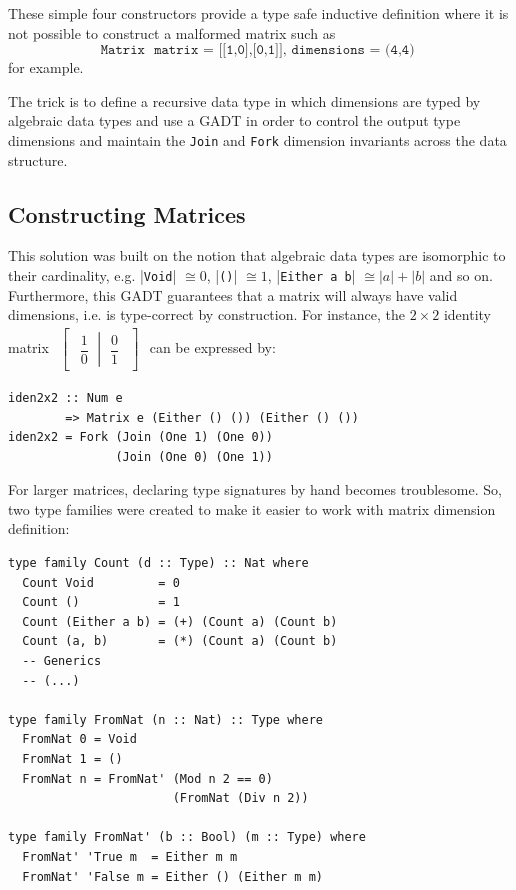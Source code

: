 \documentclass[sigplan,screen]{acmart}
\newcommand{\hs}{\texttt}
\begin{document}
These simple four constructors provide a type safe inductive definition where it is not possible to construct a malformed matrix such as \[\hs{Matrix { matrix = [[1,0],[0,1]], dimensions = (4,4) }}\] for example.

The trick is to define a recursive data type in which dimensions are typed by algebraic data types and use a GADT in order to control the output type dimensions and maintain the \hs{Join} and \hs{Fork} dimension invariants across the data structure.

\subsection{Constructing Matrices}

This solution was built on the notion that algebraic data types are isomorphic to their cardinality, e.g. |\hs{Void}| $ \cong 0$, |\hs{()}| $\cong 1$, |\hs{Either a b}| $\cong |a| + |b|$ and so on. Furthermore, this GADT guarantees that a matrix will always have valid dimensions, i.e. is type-correct by construction. For instance, the $2 \times 2$ identity matrix
%
$\begin{aligned}
\begin{bmatrix}
\left.\begin{matrix}
\dfrac{1}{0}
\end{matrix}\ \right|\ \begin{matrix}
\dfrac{0}{1}
\end{matrix}
\end{bmatrix}
\end{aligned}{}$ can be expressed by:
\vspace{1mm}
\begin{verbatim}
iden2x2 :: Num e 
        => Matrix e (Either () ()) (Either () ())
iden2x2 = Fork (Join (One 1) (One 0)) 
               (Join (One 0) (One 1))
\end{verbatim}
\vspace{1mm}

For larger matrices, declaring type signatures by hand becomes troublesome. So, two type families were created to make it easier to work with matrix dimension definition:

\vspace{1mm}
\begin{verbatim}
type family Count (d :: Type) :: Nat where
  Count Void         = 0
  Count ()           = 1
  Count (Either a b) = (+) (Count a) (Count b)
  Count (a, b)       = (*) (Count a) (Count b)
  -- Generics
  -- (...)
  
type family FromNat (n :: Nat) :: Type where
  FromNat 0 = Void
  FromNat 1 = ()
  FromNat n = FromNat' (Mod n 2 == 0) 
                       (FromNat (Div n 2))

type family FromNat' (b :: Bool) (m :: Type) where
  FromNat' 'True m  = Either m m
  FromNat' 'False m = Either () (Either m m)
\end{verbatim}
\vspace{1mm}
\end{document}
